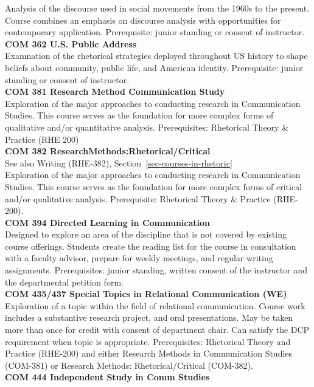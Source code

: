 \documentclass[
  letterpaper,
]{scrbook}
\begin{document}
Analysis of the discourse used in social movements from the 1960s to the
present. Course combines an emphasis on discourse analysis with
opportunities for contemporary application. Prerequisite: junior
standing or consent of instructor.\\
\textbf{COM 362 U.S. Public Address}\\
Examnation of the rhetorical strategies deployed throughout US history
to shape beliefs about community, public life, and American identity.
Prerequisite: junior standing or consent of instructor.\\
\textbf{COM 381 Research Method Communication Study}\\
Exploration of the major approaches to conducting research in
Communication Studies. This course serves as the foundation for more
complex forms of qualitative and/or quantitative analysis.
Prerequisites: Rhetorical Theory \& Practice (RHE 200)\\
\textbf{COM 382 ResearchMethods:Rhetorical/Critical}\\
See also Writing (RHE-382), Section~\ref{sec-courses-in-rhetoric}\\
Exploration of the major approaches to conducting research in
Communication Studies. This course serves as the foundation for more
complex forms of critical and/or qualitative analysis. Prerequisite:
Rhetorical Theory \& Practice (RHE-200).\\
\textbf{COM 394 Directed Learning in Communication}\\
Designed to explore an area of the discipline that is not covered by
existing course offerings. Students create the reading list for the
course in consultation with a faculty advisor, prepare for weekly
meetings, and regular writing assignments. Prerequisites: junior
standing, written consent of the instructor and the departmental
petition form.\\
\textbf{COM 435/437 Special Topics in Relational Communication (WE)}\\
Exploration of a topic within the field of relational communication.
Course work includes a substantive research project, and oral
presentations. May be taken more than once for credit with consent of
department chair. Can satisfy the DCP requirement when topic is
appropriate. Prerequisites: Rhetorical Theory and Practice (RHE-200) and
either Research Methods in Communication Studies (COM-381) or Research
Methods: Rhetorical/Critical (COM-382).\\
\textbf{COM 444 Independent Study in Comm Studies}\\
\end{document}
